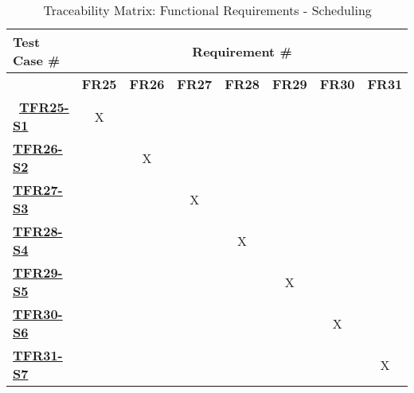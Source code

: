 \documentclass[12pt, titlepage]{article}
\begin{document}
\begin{table}[H]
    \centering
    \begin{adjustbox}{width=1\textwidth}
    \begin{tabular}{l|ccccccc}
        \textbf{Test Case \#} & \multicolumn{7}{c}{\textbf{Requirement \#}}\\
        \hline
        ~ & \textbf{FR25} & \textbf{FR26} & \textbf{FR27} & \textbf{FR28} & \textbf{FR29} & \textbf{FR30} & \textbf{FR31} \\\
        \hyperref[TFR25-S1]{\textbf{TFR25-S1}}   & X & ~ & ~ & ~ & ~ & ~ & ~ \\
        \hyperref[TFR26-S2]{\textbf{TFR26-S2}}   & ~ & X & ~ & ~ & ~ & ~ & ~\\
        \hyperref[TFR27-S3]{\textbf{TFR27-S3}}   & ~ & ~ & X & ~ & ~ & ~ & ~ \\
        \hyperref[TFR28-S4]{\textbf{TFR28-S4}}   & ~ & ~ & ~ & X & ~ & ~ & ~ \\
        \hyperref[TFR29-S5]{\textbf{TFR29-S5}}   & ~ & ~ & ~ & ~ & X & ~ & ~ \\
        \hyperref[TFR30-S6]{\textbf{TFR30-S6}}   & ~ & ~ & ~ & ~ & ~ & X & ~ \\
        \hyperref[TFR31-S7]{\textbf{TFR31-S7}}   & ~ & ~ & ~ & ~ & ~ & ~ & X \\
    \end{tabular}
    \end{adjustbox}
    \caption{Traceability Matrix: Functional Requirements - Scheduling}
    \label{Traceability Matrix: Functional Requirements - Scheduling}
\end{table}
\end{document}
